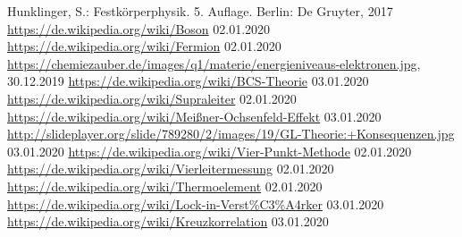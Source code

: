 \begin{thebibliography}{xxx}
		Hunklinger, S.: Festkörperphysik. 5. Auflage. Berlin: De Gruyter, 2017
		\url{https://de.wikipedia.org/wiki/Boson}
		02.01.2020
		\url{https://de.wikipedia.org/wiki/Fermion}
		02.01.2020
        \url{https://chemiezauber.de/images/q1/materie/energieniveaus-elektronen.jpg},
		30.12.2019
		\url{https://de.wikipedia.org/wiki/BCS-Theorie}
		03.01.2020
		\url{https://de.wikipedia.org/wiki/Supraleiter}
		02.01.2020
		\url{https://de.wikipedia.org/wiki/Meißner-Ochsenfeld-Effekt}
		03.01.2020
		\url{http://slideplayer.org/slide/789280/2/images/19/GL-Theorie:+Konsequenzen.jpg}
		03.01.2020
		\url{https://de.wikipedia.org/wiki/Vier-Punkt-Methode}
		02.01.2020
		\url{https://de.wikipedia.org/wiki/Vierleitermessung}
		02.01.2020
		\url{https://de.wikipedia.org/wiki/Thermoelement}
		02.01.2020
		\url{https://de.wikipedia.org/wiki/Lock-in-Verst%C3%A4rker}
		03.01.2020
		\url{https://de.wikipedia.org/wiki/Kreuzkorrelation}
		03.01.2020
\end{thebibliography}
 

